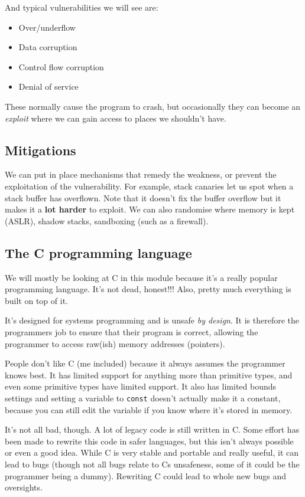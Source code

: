 \documentclass[11pt,a4paper,titlepage,dvipsnames,cmyk]{scrartcl}
\begin{document}
And typical vulnerabilities we will see are:
\begin{itemize}
    \item Over/underflow
    \item Data corruption
    \item Control flow corruption
    \item Denial of service
\end{itemize}

These normally cause the program to crash, but occasionally they can become an \textit{exploit} where we can gain access to places we shouldn't have.

\subsection{Mitigations}
We can put in place mechanisms that remedy the weakness, or prevent the exploitation of the vulnerability. For example, stack canaries let us spot when a stack buffer has overflown. Note that it doesn't fix the buffer overflow but it makes it a \textbf{lot harder} to exploit. We can also randomise where memory is kept (ASLR), shadow stacks, sandboxing (such as a firewall).

\subsection{The C programming language}
We will mostly be looking at C in this module because it's a really popular programming language. It's not dead, honest!!! Also, pretty much everything is built on top of it.

It's designed for systems programming and is unsafe \textit{by design}. It is therefore the programmers job to ensure that their program is correct, allowing the programmer to access raw(ish) memory addresses (pointers).

People don't like C (me included) because it always assumes the programmer knows best. It has limited support for anything more than primitive types, and even some primitive types have limited support. It also has limited bounds settings and setting a variable to \texttt{const} doesn't actually make it a constant, because you can still edit the variable if you know where it's stored in memory.

It's not all bad, though. A lot of legacy code is still written in C. Some effort has been made to rewrite this code in safer languages, but this isn't always possible or even a good idea. While C is very stable and portable and really useful, it can lead to bugs (though not all bugs relate to Cs unsafeness, some of it could be the programmer being a dummy). Rewriting C could lead to whole new bugs and oversights.
\end{document}
